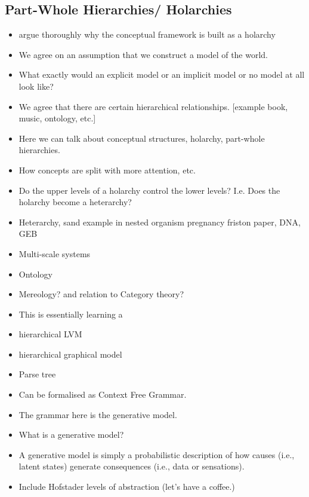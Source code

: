 \subsection{Part-Whole Hierarchies/ Holarchies}
\begin{itemize}
    \item argue thoroughly why the conceptual framework is built as a holarchy
    \item We agree on an assumption that we construct a model of the world.
    \item What exactly would an explicit model or an implicit model or no model at all look like?
    \item We agree that there are certain hierarchical relationships. [example book, music, ontology, etc.]
    \item Here we can talk about conceptual structures, holarchy, part-whole hierarchies. 
    \item How concepts are split with more attention, etc. 
    \item Do the upper levels of a holarchy control the lower levels? I.e. Does the holarchy become a heterarchy?
    \item Heterarchy, sand example in nested organism pregnancy friston paper, DNA, GEB
    \item Multi-scale systems
    \item Ontology
    \item Mereology? and relation to Category theory?
    \item This is essentially learning a 
        \item hierarchical LVM
        \item hierarchical graphical model
        \item Parse tree
        \item Can be formalised as Context Free Grammar. 
        \item The grammar here is the generative model. 
        \item What is a generative model?
        \item A generative model is simply a probabilistic description of how causes (i.e., latent states) generate consequences (i.e., data or sensations). \cite{friston_world_2021}
    \item Include Hofstader levels of abstraction (let's have a coffee.)
\end{itemize}


